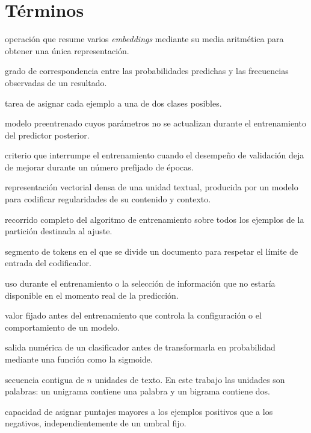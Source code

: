 \section*{Términos}
\begin{description}
  \setlength{\itemsep}{0.15\baselineskip}
  \setlength{\parskip}{0pt}
  \item[Agregación por promedio:] operación que resume varios \textit{embeddings} mediante su media aritmética para obtener una única representación.
  \item[Calibración:] grado de correspondencia entre las probabilidades predichas y las frecuencias observadas de un resultado.
  \item[Clasificación binaria:] tarea de asignar cada ejemplo a una de dos clases posibles.
  \item[Codificador congelado:] modelo preentrenado cuyos parámetros no se actualizan durante el entrenamiento del predictor posterior.
  \item[Detención temprana:] criterio que interrumpe el entrenamiento cuando el desempeño de validación deja de mejorar durante un número prefijado de épocas.
  \item[\textit{Embedding}:] representación vectorial densa de una unidad textual, producida por un modelo para codificar regularidades de su contenido y contexto.
  \item[Época:] recorrido completo del algoritmo de entrenamiento sobre todos los ejemplos de la partición destinada al ajuste.
  \item[Fragmento:] segmento de tokens en el que se divide un documento para respetar el límite de entrada del codificador.
  \item[Fuga de información:] uso durante el entrenamiento o la selección de información que no estaría disponible en el momento real de la predicción.
  \item[Hiperparámetro:] valor fijado antes del entrenamiento que controla la configuración o el comportamiento de un modelo.
  \item[Logit:] salida numérica de un clasificador antes de transformarla en probabilidad mediante una función como la sigmoide.
  \item[$n$-grama:] secuencia contigua de $n$ unidades de texto. En este trabajo las unidades son palabras: un unigrama contiene una palabra y un bigrama contiene dos.
  \item[Ordenamiento:] capacidad de asignar puntajes mayores a los ejemplos positivos que a los negativos, independientemente de un umbral fijo.

\end{description}
